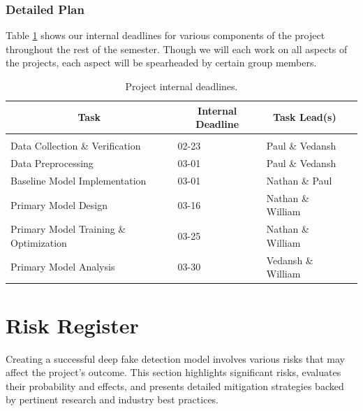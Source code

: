\documentclass{article} %
\begin{document}
\subsubsection{Detailed Plan}
\label{detailed_plan}

Table \ref{plan_table} shows our internal deadlines for various components of the project throughout the rest of the semester. Though we will each work on all aspects of the projects, each aspect will be spearheaded by certain group members.

    \begin{table}[t]
    \caption{Project internal deadlines.}
    \label{plan_table}
    \begin{center}
    \begin{tabular}{llll}
    \multicolumn{1}{c}{\bf Task}            & \multicolumn{1}{c}{\bf Internal Deadline} & \multicolumn{1}{c}{\bf Task Lead(s)}
    \\ \hline \\
    Data Collection \& Verification         & 02-23                                     & Paul \& Vedansh \\
    Data Preprocessing                      & 03-01                                     & Paul \& Vedansh \\
    Baseline Model Implementation           & 03-01                                     & Nathan \& Paul \\                   
    Primary Model Design                    & 03-16                                     & Nathan \& William \\
    Primary Model Training \& Optimization  & 03-25                                     & Nathan \& William \\
    Primary Model Analysis                  & 03-30                                     & Vedansh \& William \\
    \end{tabular}
    \end{center}
    \end{table}
    

\section{Risk Register}
\label{risk}
Creating a successful deep fake detection model involves various risks that may affect the project's outcome. This section highlights significant risks, evaluates their probability and effects, and presents detailed mitigation strategies backed by pertinent research and industry best practices.
\end{document}
